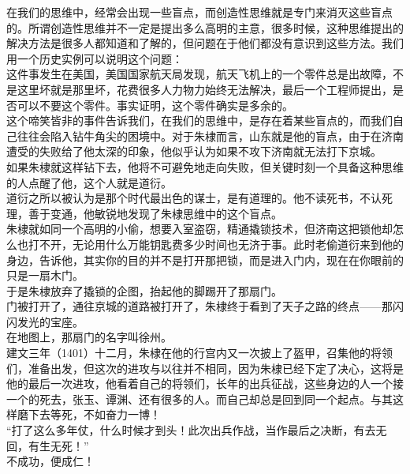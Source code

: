 \begin{multicols}{\theparacolNo}
在我们的思维中，经常会出现一些盲点，而创造性思维就是专门来消灭这些盲点的。所谓创造性思维并不一定是提出多么高明的主意，很多时候，这种思维提出的解决方法是很多人都知道和了解的，但问题在于他们都没有意识到这些方法。我们用一个历史实例可以说明这个问题：\\

这件事发生在美国，美国国家航天局发现，航天飞机上的一个零件总是出故障，不是这里坏就是那里坏，花费很多人力物力始终无法解决，最后一个工程师提出，是否可以不要这个零件。事实证明，这个零件确实是多余的。\\

这个啼笑皆非的事件告诉我们，在我们的思维中，是存在着某些盲点的，而我们自己往往会陷入钻牛角尖的困境中。对于朱棣而言，山东就是他的盲点，由于在济南遭受的失败给了他太深的印象，他似乎认为如果不攻下济南就无法打下京城。\\

如果朱棣就这样钻下去，他将不可避免地走向失败，但关键时刻一个具备这种思维的人点醒了他，这个人就是道衍。\\

道衍之所以被认为是那个时代最出色的谋士，是有道理的。他不读死书，不认死理，善于变通，他敏锐地发现了朱棣思维中的这个盲点。\\

朱棣就如同一个高明的小偷，想要入室盗窃，精通撬锁技术，但济南这把锁他却怎么也打不开，无论用什么万能钥匙费多少时间也无济于事。此时老偷道衍来到他的身边，告诉他，其实你的目的并不是打开那把锁，而是进入门内，现在在你眼前的只是一扇木门。\\

于是朱棣放弃了撬锁的企图，抬起他的脚踢开了那扇门。\\

门被打开了，通往京城的道路被打开了，朱棣终于看到了天子之路的终点——那闪闪发光的宝座。\\

在地图上，那扇门的名字叫徐州。\\

建文三年（1401）十二月，朱棣在他的行宫内又一次披上了盔甲，召集他的将领们，准备出发，但这次的进攻与以往并不相同，因为朱棣已经下定了决心，这将是他的最后一次进攻，他看着自己的将领们，长年的出兵征战，这些身边的人一个接一个的死去，张玉、谭渊、还有很多的人。而自己却总是回到同一个起点。与其这样磨下去等死，不如奋力一博！\\

“打了这么多年仗，什么时候才到头！此次出兵作战，当作最后之决断，有去无回，有生无死！”\\

不成功，便成仁！\\


\end{multicols}
